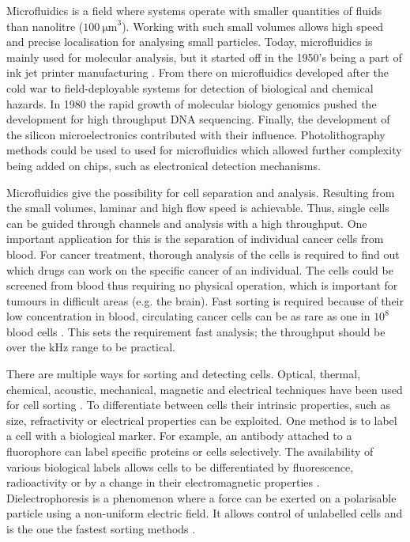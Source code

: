 \documentclass[draft]{jyflluk}
\begin{document}
Microfluidics is a field where systems operate with smaller quantities of fluids than nanolitre ($\SI{100}{\micro \metre}^3$). Working with such small volumes allows high speed and precise localisation for analysing small particles. Today, microfluidics is mainly used for molecular analysis, but it started off in the 1950’s being a part of ink jet printer manufacturing \cite{gervais_microfluidic_2011}. From there on microfluidics developed after the cold war to field-deployable systems for detection of biological and chemical hazards. In 1980 the rapid growth of molecular biology genomics pushed the development for high throughput DNA sequencing. Finally, the development of the silicon microelectronics contributed with their influence. Photolithography methods could be used to used for microfluidics which allowed further complexity being added on chips, such as electronical detection mechanisms. \cite{whitesides_origins_2006}

Microfluidics give the possibility for cell separation and analysis. Resulting from the small volumes, laminar and high flow speed is achievable. Thus, single cells can be guided through channels and analysis with a high throughput. One important application for this is the separation of individual cancer cells from blood. For cancer treatment, thorough analysis of the cells is required to find out which drugs can work on the specific cancer of an individual. The cells could be screened from blood thus requiring no physical operation, which is important for tumours in difficult areas (e.g. the brain). Fast sorting is required because of their low concentration in blood, circulating cancer cells can be as rare as one in $10^8$ blood cells \cite{huang_enrichment_2013}. This sets the requirement fast analysis; the throughput should be over the kHz range to be practical. 

There are multiple ways for sorting and detecting cells. Optical, thermal, chemical, acoustic, mechanical, magnetic and electrical techniques have been used for cell sorting \cite{ahn_dielectrophoretic_2006,zhang_towards_2015, voldman_electrical_2006}. To differentiate between cells their intrinsic properties, such as size, refractivity or electrical properties can be exploited. One method is to label a cell with a biological marker.  For example, an antibody attached to a fluorophore can label specific proteins or cells selectively. The availability of various biological labels allows cells to be differentiated by fluorescence, radioactivity or by a change in their electromagnetic properties \cite{wilhelm_universal_2008}. Dielectrophoresis is a phenomenon where a force can be exerted on a polarisable particle using a non-uniform electric field. It allows control of unlabelled cells and is the one the fastest sorting methods \cite{zhang_towards_2015}.
\end{document}
